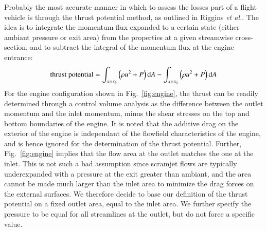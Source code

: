 \documentclass{warpdoc}
\numberwithin{equation}{section}
\newcommand{\ordi}{{\rm d}}
\begin{document}
Probably the most accurate manner in which to assess the losses part of
a flight vehicle is through the thrust potential method, as outlined in
Riggins {\it et al.}\cite{jpp:1997:riggins}. The idea is to integrate the
momentum flux expanded to a certain state (either ambiant pressure or exit
area) from the properties at a given streamwise cross-section, and to subtract
the integral of the momentum flux at the engine entrance:
%
\begin{equation}
 {\rm thrust~potential} = \int_{x=x_3} \left(\rho u^2 + P \right) \ordi A
   - \int_{x=x_1} \left(\rho u^2 + P \right) \ordi A
\end{equation}
%
For the engine configuration shown in  Fig.~\ref{fig:engine}, the thrust 
can be readily determined
through a control volume analysis as the difference between the outlet
momentum and the inlet momentum, minus the shear stresses on the top and bottom
boundaries of the engine. It is noted that the additive drag on the 
exterior of the engine is independant of the flowfield characteristics
of the engine, and is hence ignored for the determination of the thrust
potential. Further, Fig.~\ref{fig:engine} implies that the flow area at
the outlet matches the one at the inlet. This is not such a bad assumption
since scramjet flows are typically underexpanded\cite{book:1994:pratt}
with a pressure at the exit greater than ambiant, and the area cannot
be made much larger than the inlet area to minimize the drag forces on
the external surfaces.  We therefore decide to base our definition of 
the thrust potential on a fixed outlet area, equal to the inlet area. 
We further specify the pressure to be equal for all streamlines at the outlet,
but do not force a specific value. 
\end{document}
